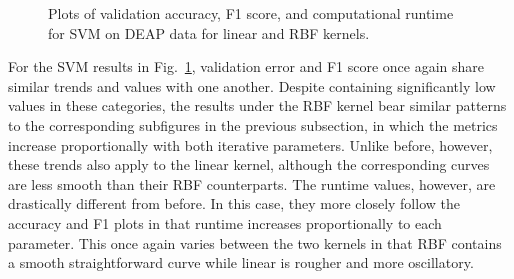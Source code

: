 \documentclass[12pt]{uthesis-v12}  %
\begin{document}
\begin{figure}
	\hfill	
{}
						
\caption{Plots of validation accuracy, F1 score, and computational runtime for SVM on DEAP data for linear and RBF kernels.}
	\label{svm-deap}
	\end{figure}
	
For the SVM results in Fig.~\ref{svm-deap}, validation error and F1 score once again share similar trends and values with one another. Despite containing significantly low values in these categories, the results under the RBF kernel bear similar patterns to the corresponding subfigures in the previous subsection, in which the metrics increase proportionally with both iterative parameters. Unlike before, however, these trends also apply to the linear kernel, although the corresponding curves are less smooth than their RBF counterparts. The runtime values, however, are drastically different from before. In this case, they more closely follow the accuracy and F1 plots in that runtime increases proportionally to each parameter. This once again varies between the two kernels in that RBF contains a smooth straightforward curve while linear is rougher and more oscillatory.
\end{document}
